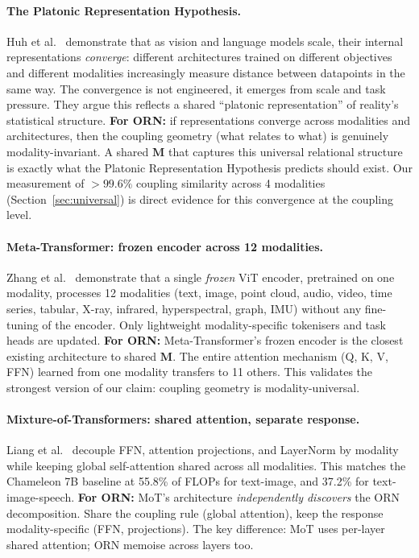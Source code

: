 \documentclass[11pt, a4paper]{article}
\newcommand{\M}{\mathbf{M}}
\theoremstyle{plain}
\theoremstyle{remark}
\begin{document}
\paragraph{The Platonic Representation Hypothesis.}
Huh et al.~\cite{huh2024platonic} demonstrate that as vision and language models scale, their internal representations \emph{converge}: different architectures trained on different objectives and different modalities increasingly measure distance between datapoints in the same way.
The convergence is not engineered, it emerges from scale and task pressure.
They argue this reflects a shared ``platonic representation'' of reality's statistical structure.
\textbf{For ORN:} if representations converge across modalities and architectures, then the coupling geometry (what relates to what) is genuinely modality-invariant.
A shared $\M$ that captures this universal relational structure is exactly what the Platonic Representation Hypothesis predicts should exist.
Our measurement of $>99.6\%$ coupling similarity across 4 modalities (Section~\ref{sec:universal}) is direct evidence for this convergence at the coupling level.

\paragraph{Meta-Transformer: frozen encoder across 12 modalities.}
Zhang et al.~\cite{zhang2023metatransformer} demonstrate that a single \emph{frozen} ViT encoder, pretrained on one modality, processes 12 modalities (text, image, point cloud, audio, video, time series, tabular, X-ray, infrared, hyperspectral, graph, IMU) without any fine-tuning of the encoder.
Only lightweight modality-specific tokenisers and task heads are updated.
\textbf{For ORN:} Meta-Transformer's frozen encoder is the closest existing architecture to shared $\M$.
The entire attention mechanism (Q, K, V, FFN) learned from one modality transfers to 11 others.
This validates the strongest version of our claim: coupling geometry is modality-universal.

\paragraph{Mixture-of-Transformers: shared attention, separate response.}
Liang et al.~\cite{liang2024mot} decouple FFN, attention projections, and LayerNorm by modality while keeping global self-attention shared across all modalities.
This matches the Chameleon 7B baseline at 55.8\% of FLOPs for text-image, and 37.2\% for text-image-speech.
\textbf{For ORN:} MoT's architecture \emph{independently discovers} the ORN decomposition.
Share the coupling rule (global attention), keep the response modality-specific (FFN, projections).
The key difference: MoT uses per-layer shared attention; ORN memoise across layers too.
\end{document}
